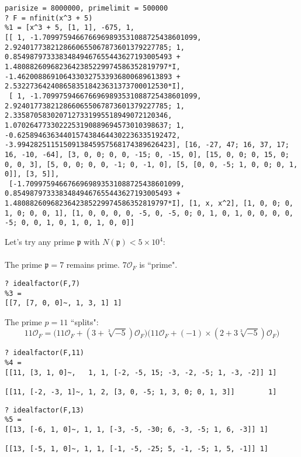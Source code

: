 \documentclass[12pt]{article}
\begin{document}
{\begin{verbatim}
parisize = 8000000, primelimit = 500000
? F = nfinit(x^3 + 5)
%1 = [x^3 + 5, [1, 1], -675, 1, 
[[ 1, -1.7099759466766969893531088725438601099, 2.9240177382128660655067873601379227785; 1, 0.85498797333834849467655443627193005493 + 1.4808826096823642385229974586352819797*I, -1.4620088691064330327533936800689613893 + 2.5322736424086583518423631373700012530*I], 
 [ 1, -1.7099759466766969893531088725438601099, 2.9240177382128660655067873601379227785; 1, 2.3358705830207127331995518949072120346, 1.0702647733022253190889694573010398637; 1, -0.62589463634401574384644302236335192472, -3.9942825115150913845957568174389626423], [16, -27, 47; 16, 37, 17; 16, -10, -64], [3, 0, 0; 0, 0, -15; 0, -15, 0], [15, 0, 0; 0, 15, 0; 0, 0, 3], [5, 0, 0; 0, 0, -1; 0, -1, 0], [5, [0, 0, -5; 1, 0, 0; 0, 1, 0]], [3, 5]], 
 [-1.7099759466766969893531088725438601099, 0.85498797333834849467655443627193005493 + 1.4808826096823642385229974586352819797*I], [1, x, x^2], [1, 0, 0; 0, 1, 0; 0, 0, 1], [1, 0, 0, 0, 0, -5, 0, -5, 0; 0, 1, 0, 1, 0, 0, 0, 0, -5; 0, 0, 1, 0, 1, 0, 1, 0, 0]]
\end{verbatim}
Let's try any prime $\mathfrak{p}$ with $N(\mathfrak{p}) < 5 \times 10^4$: \\ \\
The prime $\mathfrak{p}= 7$ remains prime.  $7\mathcal{O}_F$ is ``prime".
\begin{verbatim}
? idealfactor(F,7)
%3 = 
[[7, [7, 0, 0]~, 1, 3, 1] 1]
\end{verbatim}
The prime $p = 11$ ``splits":
$$ 11\mathcal{O}_F=\big(11\mathcal{O}_F + (3 + \sqrt[3]{-5})\mathcal{O}_F\big)\big(11\mathcal{O}_F  + (-1) \times (2 +3\sqrt[3]{-5})\mathcal{O}_F\big) $$
\begin{verbatim}
? idealfactor(F,11)
%4 = 
[[11, [3, 1, 0]~,   1, 1, [-2, -5, 15; -3, -2, -5; 1, -3, -2]] 1]

[[11, [-2, -3, 1]~, 1, 2, [3, 0, -5; 1, 3, 0; 0, 1, 3]]        1]
\end{verbatim}
\begin{verbatim}
? idealfactor(F,13)
%5 = 
[[13, [-6, 1, 0]~, 1, 1, [-3, -5, -30; 6, -3, -5; 1, 6, -3]] 1]

[[13, [-5, 1, 0]~, 1, 1, [-1, -5, -25; 5, -1, -5; 1, 5, -1]] 1]


\end{verbatim}}
\end{document}
